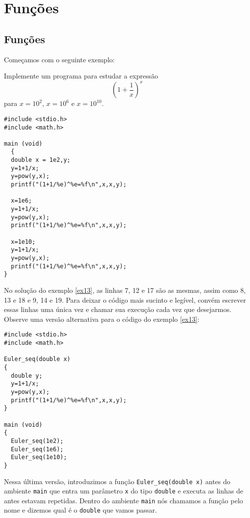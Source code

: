 
\chapter{Funções}
\section{Funções}
Começamos com o seguinte exemplo:
\begin{ex}\label{ex13}Implemente um programa para estudar a expressão 
$$
\left(1+\frac{1}{x}\right)^x
$$
para $x=10^{2}$, $x=10^{6}$ e $x=10^{10}$.
\end{ex}
\begin{verbatim}
#include <stdio.h>
#include <math.h>
 
main (void)
  {
  double x = 1e2,y;
  y=1+1/x;
  y=pow(y,x);
  printf("(1+1/%e)^%e=%f\n",x,x,y);

  x=1e6;
  y=1+1/x;
  y=pow(y,x);
  printf("(1+1/%e)^%e=%f\n",x,x,y);

  x=1e10;
  y=1+1/x;
  y=pow(y,x);
  printf("(1+1/%e)^%e=%f\n",x,x,y);
}
\end{verbatim}
No solução do exemplo \ref{ex13}, as linhas 7, 12 e 17 são as mesmas, assim como 8, 13 e 18 e 9, 14 e 19. Para deixar o código mais sucinto e legível, convém escrever essas linhas uma única vez e chamar sua execução cada vez que desejarmos. Observe uma versão alternativa para o código do exemplo \ref{ex13}:
\begin{verbatim}
#include <stdio.h>
#include <math.h>

Euler_seq(double x)
{
  double y;
  y=1+1/x;
  y=pow(y,x);
  printf("(1+1/%e)^%e=%f\n",x,x,y);
}

main (void)
{
  Euler_seq(1e2);
  Euler_seq(1e6);
  Euler_seq(1e10);
}
\end{verbatim}
Nessa última versão, introduzimos a função \verb|Euler_seq(double x)| antes do ambiente \verb|main| que entra um parâmetro \verb|x| do tipo \verb|double| e executa as linhas de antes estavam repetidas. Dentro do ambiente \verb|main| nós chamamos a função pelo nome e dizemos qual é o \verb|double| que vamos passar.

